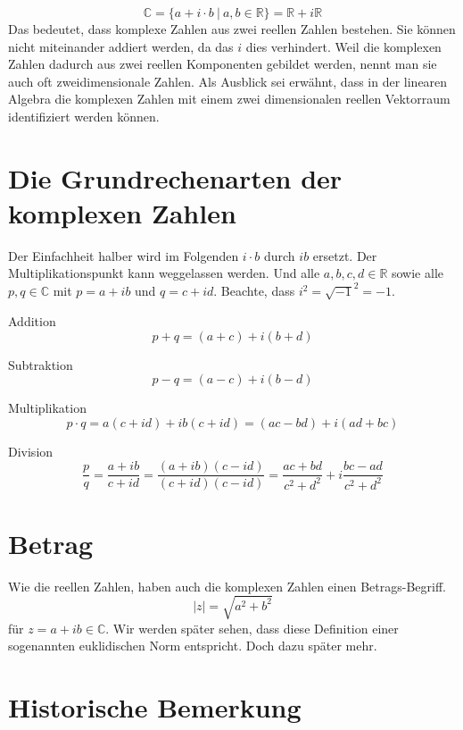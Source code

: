 \[ \mathbb{C} = \{ a+i\cdot b \ |\ a,b \in \mathbb{R} \} = \mathbb{R}+i\mathbb{R} \]
Das bedeutet, dass komplexe Zahlen aus zwei reellen Zahlen bestehen. Sie können nicht miteinander addiert werden, da das $i$ dies verhindert. Weil die komplexen Zahlen dadurch aus zwei reellen Komponenten gebildet werden, nennt man sie auch oft zweidimensionale Zahlen. Als Ausblick sei erwähnt, dass in der linearen Algebra die komplexen Zahlen mit einem zwei dimensionalen reellen Vektorraum identifiziert werden können.

\section{Die Grundrechenarten der komplexen Zahlen}

Der Einfachheit halber wird im Folgenden $i\cdot b$ durch $ib$ ersetzt. Der Multiplikationspunkt kann weggelassen werden. Und alle $a,b,c,d \in \mathbb{R}$ sowie alle $p,q \in \mathbb{C}$ mit $p = a+ib$ und $q = c+id$. Beachte, dass $i^2=\sqrt{-1}^2 = -1$.

\begin{definition} Addition
\[ p+q = (a+c)+i(b+d)\]
\end{definition}

\begin{definition} Subtraktion
\[ p-q = (a-c)+i(b-d)\]
\end{definition}

\begin{definition} Multiplikation
\[ p\cdot q = a(c+id)+ib(c+id) = (ac-bd)+i(ad+bc)  \]
\end{definition}

\begin{definition} Division
\[ \frac{p}{q} = \frac{a+ib}{c+id} = \frac{(a+ib)(c-id)}{(c+id)(c-id)} = \frac{ac+bd}{c^2+d^2} + i\frac{bc-ad}{c^2+d^2}\]
\end{definition}

\section{Betrag}

Wie die reellen Zahlen, haben auch die komplexen Zahlen einen Betrags-Begriff.
\[
\vert z \vert = \sqrt{a^2 +b^2}
\]
für $z = a+ib \in \mathbb{C}$. Wir werden später sehen, dass diese Definition einer sogenannten euklidischen Norm entspricht. Doch dazu später mehr.


\section{Historische Bemerkung} 

